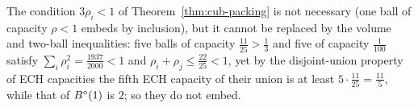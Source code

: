 \begin{remark}[Obstructions]\label{rem:cub-obstructions}
The condition $3\rho_i<1$ of Theorem~\ref{thm:cub-packing} is not necessary (one ball of capacity $\rho<1$ embeds by
inclusion), but it cannot be replaced by the volume and two-ball inequalities: five balls of capacity
$\frac{11}{25}>\frac13$ and five of capacity $\frac1{100}$ satisfy $\sum_i\rho_i^2=\frac{1937}{2000}<1$ and
$\rho_i+\rho_j\le\frac{22}{25}<1$, yet by the disjoint-union property of ECH capacities \cite{Hutchings2011} the fifth ECH
capacity of their union is at least $5\cdot\frac{11}{25}=\frac{11}5$, while that of $B^{\circ}(1)$ is $2$; so they do not embed.
\end{remark}
